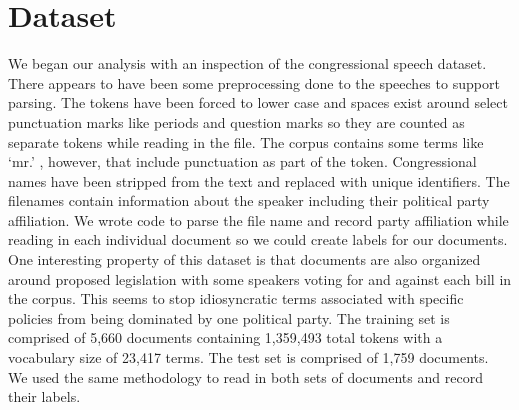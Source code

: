 \documentclass[a4paper, 11pt]{article}
\begin{document}
\section{Dataset}
We began our analysis with an inspection of the congressional speech dataset. There appears to have been some preprocessing done to the speeches to support parsing. The tokens have been forced to lower case and spaces exist around select punctuation marks like periods and question marks so they are counted as separate tokens while reading in the file. The corpus contains some terms like `mr.' , however, that include punctuation as part of the token. Congressional names have been stripped from the text and replaced with unique identifiers.  The filenames contain information about the speaker including their political party affiliation. We wrote code to parse the file name and record party affiliation while reading in each individual document so we could create labels for our documents. One interesting property of this dataset is that documents are also organized around proposed legislation with some speakers voting for and against each bill in the corpus. This seems to stop idiosyncratic terms associated with specific policies from being dominated by one political party. The training set is comprised of 5,660 documents containing 1,359,493 total tokens with a vocabulary size of 23,417 terms. The test set is comprised of 1,759 documents. We used the same methodology to read in both sets of documents and record their labels.\\
\end{document}

